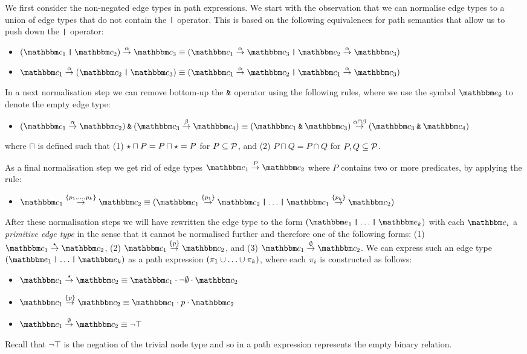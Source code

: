 We first consider the non-negated edge types in path expressions. We start with the observation that we can normalise edge types to a union of edge types that do not contain the $\mathbin{\texttt{|}}$ operator.
This is based on the following equivalences for path semantics that allow us to push down the $\mathbin{\texttt{|}}$ operator:
\begin{itemize}
    \item $\et{(\ntype_1 \tOr \ntype_2)}{\alpha}{\ntype_3} \equiv ( \et{\ntype_1}{\alpha}{\ntype_3} \tOr \et{\ntype_2}{\alpha}{\ntype_3} )$
    \item $\et{\ntype_1}{\alpha}{(\ntype_2 \tOr \ntype_3)} \equiv ( \et{\ntype_1}{\alpha}{\ntype_2} \tOr \et{\ntype_1}{\alpha}{\ntype_3} )$
\end{itemize}
In a next normalisation step we can remove bottom-up the $\mathbin{\texttt{\&}}$ operator using the following rules, where we use the symbol $\etype_{\emptyset}$ to denote the empty edge type:
\begin{itemize}
    \item $(\et{\ntype_1}{\alpha}{\ntype_2}) \tAnd (\et{\ntype_3}{\beta}{\ntype_4}) \equiv \et{(\ntype_1 \tAnd \ntype_3)}{\alpha \sqcap \beta}{(\ntype_3 \tAnd \ntype_4)}$
\end{itemize}
where $\sqcap$ is defined such that (1) $\star \sqcap P = P \sqcap \star = P$ for $P \subseteq \mathcal{P}$, and (2) $P \sqcap Q = P \cap Q$ for $P, Q \subseteq \mathcal{P}$.

As a final normalisation step we get rid of edge types $\et{\ntype_1}{P}{\ntype_2}$ where $P$ contains two or more predicates, by applying the rule:
\begin{itemize}
    \item $\et{\ntype_1}{\{ p_1, \ldots, p_k \}}{\ntype_2} \equiv (\et{\ntype_1}{\{ p_1 \}}{\ntype_2} \tOr \ldots \tOr \et{\ntype_1}{\{ p_k \}}{\ntype_2})$
\end{itemize}

After these normalisation steps we will have rewritten the edge type to the form $(\etype_1 \tOr \ldots \tOr \etype_k)$ with each $\etype_i$ a \emph{primitive edge type} in the sense that it cannot be normalised further and therefore one of the following forms:
(1) $\et{\ntype_1}{\pwc}{\ntype_2}$, 
(2) $\et{\ntype_1}{\{ p \}}{\ntype_2}$, and 
(3) $\et{\ntype_1}{\emptyset}{\ntype_2}$.
We can express such an edge type $(\etype_1 \tOr \ldots \tOr \etype_k)$ as a path expression $(\pi_1 \cup \ldots \cup \pi_k)$, where each $\pi_i$ is constructed as follows:
\begin{itemize}
    \item $\et{\ntype_1}{\pwc}{\ntype_2} \equiv \ntype_1 \cdot \neg \emptyset \cdot \ntype_2$
    \item $\et{\ntype_1}{\{ p \}}{\ntype_2} \equiv \ntype_1 \cdot p \cdot \ntype_2$
    \item $\et{\ntype_1}{\emptyset}{\ntype_2} \equiv \neg \top$
\end{itemize}
Recall that $\neg\top$ is the negation of the trivial node type and so in a path expression represents the empty binary relation.


